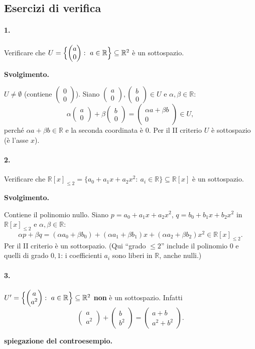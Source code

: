 \documentclass[11pt,a4paper]{article}
\newcommand{\RR}{\mathbb{R}}
\newcommand{\vect}[2]{\begin{pmatrix}#1\\#2\end{pmatrix}}
\theoremstyle{plain}
\theoremstyle{definition}
\theoremstyle{remark}
\begin{document}
\subsection{Esercizi di verifica}

\paragraph{1.} Verificare che $U=\Bigl\{\vect a0:\ a\in\RR\Bigr\}\subseteq\RR^2$ è un sottospazio.

\par\medskip
\noindent\textbf{Svolgimento.}\par

$U\neq\emptyset$ (contiene $\vect00$). Siano $\vect a0,\vect b0\in U$ e $\alpha,\beta\in\RR$:
\[
  \alpha\vect a0+\beta\vect b0=\vect{\alpha a+\beta b}{0}\in U,
\]
perché $\alpha a+\beta b\in\RR$ e la seconda coordinata è $0$. Per il II criterio $U$ è sottospazio (è l'asse $x$).
\par\medskip

\paragraph{2.} Verificare che $\RR[x]_{\le2}=\{a_0+a_1x+a_2x^2:\ a_i\in\RR\}\subseteq\RR[x]$ è un sottospazio.

\par\medskip
\noindent\textbf{Svolgimento.}\par

Contiene il polinomio nullo. Siano $p=a_0+a_1x+a_2x^2$, $q=b_0+b_1x+b_2x^2$ in $\RR[x]_{\le2}$ e $\alpha,\beta\in\RR$:
\[
  \alpha p+\beta q=(\alpha a_0+\beta b_0)+(\alpha a_1+\beta b_1)x+(\alpha a_2+\beta b_2)x^2\in\RR[x]_{\le2}.
\]
Per il II criterio è un sottospazio. (Qui ``grado $\le2$'' include il polinomio $0$ e quelli di grado $0,1$: i coefficienti $a_i$ sono liberi in $\RR$, anche nulli.)
\par\medskip

\paragraph{3.} $U'=\Bigl\{\vect a{a^2}:\ a\in\RR\Bigr\}\subseteq\RR^2$ \textbf{non} è un sottospazio.
Infatti
\[
  \vect a{a^2}+\vect b{b^2}=\vect{a+b}{a^2+b^2}.
\]

\par\medskip
\noindent\textbf{spiegazione del controesempio.}\par
\end{document}
